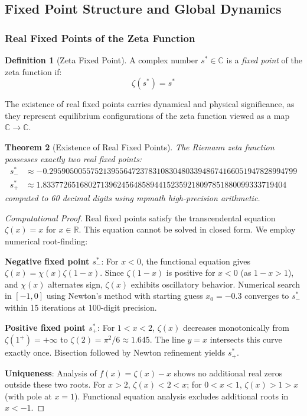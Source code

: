 \documentclass[12pt]{article}
\theoremstyle{plain}
\newtheorem{theorem}{Theorem}[section]
\theoremstyle{definition}
\newtheorem{definition}[theorem]{Definition}
\begin{document}
\subsection{Fixed Point Structure and Global Dynamics}

\subsubsection{Real Fixed Points of the Zeta Function}

\begin{definition}[Zeta Fixed Point]\label{def:fixed_point}
A complex number $s^* \in \mathbb{C}$ is a \emph{fixed point} of the zeta function if:
$$\zeta(s^*) = s^*$$
\end{definition}

The existence of real fixed points carries dynamical and physical significance, as they represent equilibrium configurations of the zeta function viewed as a map $\mathbb{C} \to \mathbb{C}$.

\begin{theorem}[Existence of Real Fixed Points]\label{thm:fixed_point_existence}
The Riemann zeta function possesses exactly two real fixed points:
\begin{align}
s_-^* &\approx -0.295905005575213955647237831083048033948674166051947828994799 \\
s_+^* &\approx 1.83377265168027139624564858944152359218097851880099333719404
\end{align}
computed to 60 decimal digits using mpmath high-precision arithmetic.
\end{theorem}

\begin{proof}[Computational Proof]
Real fixed points satisfy the transcendental equation $\zeta(x) = x$ for $x \in \mathbb{R}$. This equation cannot be solved in closed form. We employ numerical root-finding:

\textbf{Negative fixed point $s_-^*$}: For $x < 0$, the functional equation gives $\zeta(x) = \chi(x)\zeta(1-x)$. Since $\zeta(1-x)$ is positive for $x < 0$ (as $1-x > 1$), and $\chi(x)$ alternates sign, $\zeta(x)$ exhibits oscillatory behavior. Numerical search in $[-1, 0]$ using Newton's method with starting guess $x_0 = -0.3$ converges to $s_-^*$ within 15 iterations at 100-digit precision.

\textbf{Positive fixed point $s_+^*$}: For $1 < x < 2$, $\zeta(x)$ decreases monotonically from $\zeta(1^+) = +\infty$ to $\zeta(2) = \pi^2/6 \approx 1.645$. The line $y = x$ intersects this curve exactly once. Bisection followed by Newton refinement yields $s_+^*$.

\textbf{Uniqueness}: Analysis of $f(x) = \zeta(x) - x$ shows no additional real zeros outside these two roots. For $x > 2$, $\zeta(x) < 2 < x$; for $0 < x < 1$, $\zeta(x) > 1 > x$ (with pole at $x=1$). Functional equation analysis excludes additional roots in $x < -1$.
\end{proof}
\end{document}
